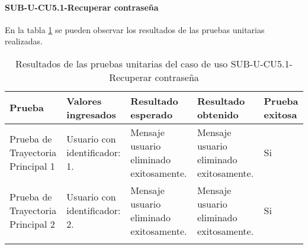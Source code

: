 \paragraph{SUB-U-CU5.1-Recuperar contraseña}\label{SUB-U-CU5.1:Pruebas}
En la tabla \ref{pruebas_unitarias_sub-u-cu5.1} se pueden observar los resultados de las pruebas unitarias realizadas.
\begin{longtable}{|M{2cm}| M{4.5cm}|M{3cm}|M{3cm}|M{1.5cm}|}
	\hline
	\textbf{Prueba} & \textbf{Valores ingresados} & \textbf{Resultado esperado} & \textbf{Resultado obtenido} & \textbf{Prueba exitosa} \\ \hline
	Prueba de Trayectoria Principal 1 & Usuario con identificador: 1.
	& 
	Mensaje usuario eliminado exitosamente.
	&
	Mensaje usuario eliminado exitosamente.
	& Si \\ \hline

	Prueba de Trayectoria Principal 2 & Usuario con identificador: 2.
	& 
	Mensaje usuario eliminado exitosamente.
	&
	Mensaje usuario eliminado exitosamente.
	& Si \\ \hline

	\caption{Resultados de las pruebas unitarias del caso de uso SUB-U-CU5.1-Recuperar contraseña}
	\label{pruebas_unitarias_sub-u-cu5.1}
\end{longtable}